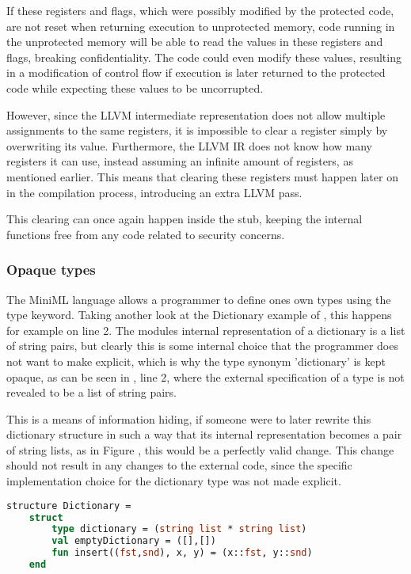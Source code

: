 If these registers and flags, which were possibly modified by the protected code, are not reset when returning execution to unprotected memory, code running in the unprotected memory will be able to read the values in these registers and flags, breaking confidentiality. The code could even modify these values, resulting in a modification of control flow if execution is later returned to the protected code while expecting these values to be uncorrupted.

However, since the LLVM intermediate representation does not allow multiple assignments to the same registers, it is impossible to clear a register simply by overwriting its value.
Furthermore, the LLVM IR does not know how many registers it can use, instead assuming an infinite amount of registers, as mentioned earlier. This means that clearing these registers must happen later on in the compilation process, introducing an extra LLVM pass.

This clearing can once again happen inside the stub, keeping the internal functions free from any code related to security concerns.

\subsubsection{Opaque types}

The \mbox{MiniML} language allows a programmer to define ones own types using the type keyword. Taking another look at the Dictionary example of , this happens for example on line 2. The modules internal representation of a dictionary is a list of string pairs, but clearly this is some internal choice that the programmer does not want to make explicit, which is why the type synonym 'dictionary' is kept opaque, as can be seen in , line 2, where the external specification of a type is not revealed to be a list of string pairs.

This is a means of information hiding, if someone were to later rewrite this dictionary structure in such a way that its internal representation becomes a pair of string lists, as in Figure , this would be a perfectly valid change. This change should not result in any changes to the external code, since the specific implementation choice for the dictionary type was not made explicit.

\begin{lstlisting}[frame=single, language=ML, label=code:DictionaryStructureExample2,caption={[Alternative Dictionary Definition]An alternative structure defining a dictionary.}]
structure Dictionary =
    struct
        type dictionary = (string list * string list)
        val emptyDictionary = ([],[])
        fun insert((fst,snd), x, y) = (x::fst, y::snd)
    end
\end{lstlisting}

